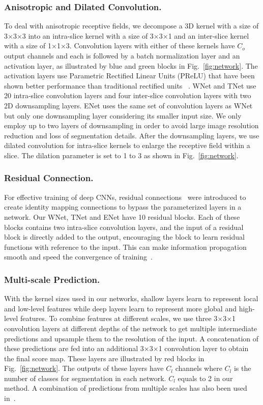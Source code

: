\documentclass[a4paper,orivec,runningheads]{llncs}
\begin{document}
\subsubsection{Anisotropic and Dilated Convolution.}
To deal with anisotropic receptive fields, we decompose a 3D kernel with a size of 3$\times$3$\times$3 into an intra-slice kernel with a size of 3$\times$3$\times$1 and an inter-slice kernel with a size of  1$\times$1$\times$3. Convolution layers with either of these kernels have $C_o$ output channels and each is followed by a batch normalization layer and an activation layer, as illustrated by blue and green blocks in Fig.~\ref{fig:network}. The activation layers use Parametric Rectified Linear Units (PReLU) that have been shown better performance than traditional rectified units~\cite{He2015iccv} .  WNet and TNet use 20 intra-slice convolution layers and four inter-slice convolution layers with two 2D downsampling layers. ENet uses the same set of convolution layers as WNet but only one downsampling layer considering its smaller input size. We only employ up to two layers of downsampling in order to avoid large image resolution reduction and loss of segmentation details. After the downsampling layers, we use dilated convolution for intra-slice kernels to enlarge the receptive field within a slice. The dilation parameter is set to 1 to 3 as shown in Fig.~\ref{fig:network}. 

\subsubsection{Residual Connection.} For effective training of deep CNNs, residual connections~\cite{He2015res} were introduced to create identity mapping connections to bypass the parameterized layers in a network. Our WNet, TNet and ENet have 10 residual blocks. Each of these blocks contains two intra-slice convolution layers, and the input of a residual block is directly added to the output, encouraging the block to learn residual functions with reference to the input. This can make information propagation smooth and speed the convergence of training~\cite{He2015res,Li2017}.

\subsubsection{Multi-scale Prediction.}  With the kernel sizes used in our networks, shallow layers learn to represent local and low-level features while deep layers learn to represent more global and high-level features. To combine features at different scales, we use three 3$\times$3$\times$1 convolution layers at different depths of the network to get multiple intermediate predictions and upsample them to the resolution of the input. A concatenation of these predictions are fed into an additional 3$\times$3$\times$1 convolution layer to obtain the final score map. These layers are illustrated by red blocks in Fig.~\ref{fig:network}. The outputs of these layers have $C_l$ channels where $C_l$ is the number of classes for segmentation in each network. $C_l$ equals to 2 in our method. A combination of predictions from multiple scales has also been used in~\cite{Xie2015,Fidon2017b}. 
\end{document}
